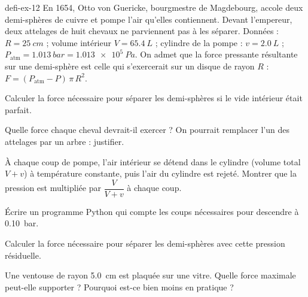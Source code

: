 \begin{blocEdition}{defi-ex-12}
En 1654, Otto von Guericke, bourgmestre de Magdebourg, accole deux demi-sphères de cuivre et pompe l'air qu'elles
contiennent. Devant l'empereur, deux attelages de huit chevaux ne parviennent pas à les séparer.
Données : $R=\qty{25}{cm}$ ; volume intérieur $V=\qty{65,4}{L}$ ; cylindre de la pompe : $v=\qty{2,0}{L}$ ; $P_\mathrm{atm}=\qty{1,013}{bar}=\qty{1,013e5}{Pa}$. On admet que la
force pressante résultante sur une demi-sphère est celle qui s'exercerait sur un disque de rayon $R$ : $F=(P_\mathrm{atm}-P)\,\pi\,R^2$.
\begin{questions}
\item Calculer la force nécessaire pour séparer les demi-sphères si le vide intérieur était parfait.
\item Quelle force chaque cheval devrait-il exercer ? On pourrait remplacer l'un des attelages par un arbre : justifier.
\item À chaque coup de pompe, l'air intérieur se détend dans le cylindre (volume total $V+v$) à température constante, puis l'air du
cylindre est rejeté. Montrer que la pression est multipliée par $\dfrac{V}{V+v}$ à chaque coup.
\item Écrire un programme Python qui compte les coups nécessaires pour descendre à \qty{0,10}{bar}.
\item Calculer la force nécessaire pour séparer les demi-sphères avec cette pression résiduelle.
\item Une ventouse de rayon \qty{5,0}{cm} est plaquée sur une vitre. Quelle force maximale peut-elle supporter ? Pourquoi est-ce bien
moins en pratique ?
\end{questions}
\end{blocEdition}

